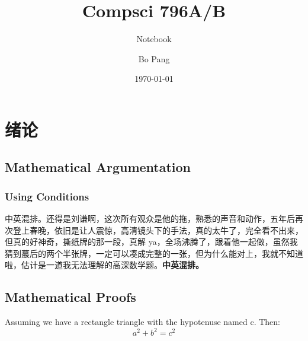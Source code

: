 \documentclass{yLectureNote}
\title{Compsci 796A/B}
\subtitle{Notebook}
\author{Bo Pang}
\date{\today}
\begin{document}
\titleOne

\yTableOfContent



\chapter{绪论}
\printMarginPartialToc


\section{Mathematical Argumentation}
\nextSerie

\lipsum[1]



\subsection{Using Conditions}
\lipsum[2]中英混排。还得是刘谦啊，这次所有观众是他的拖，熟悉的声音和动作，五年后再次登上春晚，依旧是让人震惊，高清镜头下的手法，真的太牛了，完全看不出来，但真的好神奇，撕纸牌的那一段，真解 ya，全场沸腾了，跟着他一起做，虽然我猜到蕞后的两个半张牌，一定可以凑成完整的一张，但为什么能对上，我就不知道啦，估计是一道我无法理解的高深数学题。\textbf{中英混排。}

\lipsum[3]



\section{Mathematical Proofs}
\begin{theorem}[Pythagoras]
  Assuming we have a rectangle triangle with the hypotenuse named c. Then:
  \[
    a^2 + b^2 = c^2
  \]
\end{theorem}


\nextSerie

\yOrnament
\end{document}
